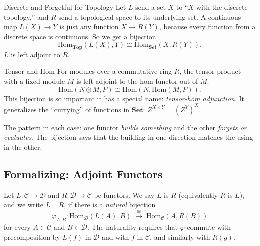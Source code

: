 \begin{example}{Discrete and Forgetful for Topology}
Let $L$ send a set $X$ to ``$X$ with the discrete topology,'' and $R$
send a topological space to its underlying set. A continuous map
$L(X) \to Y$ is just any function $X \to R(Y)$, because every function
from a discrete space is continuous. So we get a bijection
\begin{equation*}
  \mathrm{Hom}_{\mathbf{Top}}(L(X), Y) \cong \mathrm{Hom}_{\mathbf{Set}}(X, R(Y)).
\end{equation*}
$L$ is left adjoint to $R$.
\end{example}

\begin{example}{Tensor and Hom}
For modules over a commutative ring $R$, the tensor product with a
fixed module $M$ is left adjoint to the hom-functor out of $M$:
\begin{equation*}
  \mathrm{Hom}(N \otimes M, P) \cong \mathrm{Hom}(N, \mathrm{Hom}(M, P)).
\end{equation*}
This bijection is so important it has a special name: \emph{tensor-hom
adjunction}. It generalizes the ``currying'' of functions in $\mathbf{Set}$:
$Z^{X \times Y} = (Z^Y)^X$.
\end{example}

\begin{dialog}
The pattern in each case: one functor \emph{builds something} and the
other \emph{forgets or evaluates}. The bijection says that the building
in one direction matches the using in the other.
\end{dialog}

\subsection{Formalizing: Adjoint Functors}

Let $L : \mathcal{C} \to \mathcal{D}$ and $R : \mathcal{D} \to \mathcal{C}$
be functors. We say $L$ is  $R$ (equivalently $R$
is  $L$), and we write $L \dashv R$, if there is a
\emph{natural} bijection
\begin{equation*}
  \varphi_{A,B} : \mathrm{Hom}_\mathcal{D}(L(A), B)
  \;\xrightarrow{\;\cong\;}\;
  \mathrm{Hom}_\mathcal{C}(A, R(B))
\end{equation*}
for every $A \in \mathcal{C}$ and $B \in \mathcal{D}$. The naturality
requires that $\varphi$ commute with precomposition by $L(f)$ in
$\mathcal{D}$ and with $f$ in $\mathcal{C}$, and similarly with $R(g)$.

